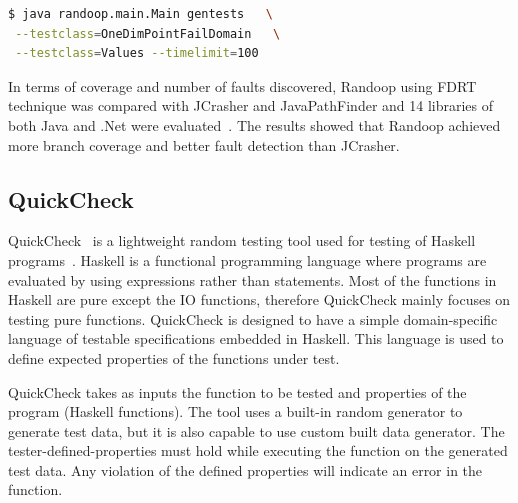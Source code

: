 \begin{lstlisting}[language=bash]
$ java randoop.main.Main gentests   \
 --testclass=OneDimPointFailDomain   \
 --testclass=Values --timelimit=100
\end{lstlisting}

In terms of coverage and number of faults discovered, Randoop using FDRT technique was compared with JCrasher and JavaPathFinder and 14 libraries of both Java and .Net were evaluated~\cite{visser2004test}. The results showed that Randoop achieved more branch coverage and better fault detection than JCrasher. 

\subsection{QuickCheck}
QuickCheck~\cite{claessen2011quickcheck} is a lightweight random testing tool used for testing of Haskell programs~\cite{hudak2007history}. Haskell is a functional programming language where programs are evaluated by using expressions rather than statements. Most of the functions in Haskell are pure except the IO functions, therefore QuickCheck mainly focuses on testing pure functions. QuickCheck is designed to have a simple domain-specific language of testable specifications embedded in Haskell. This language is used to define expected properties of the functions under test. %

QuickCheck takes as inputs the function to be tested and properties of the program (Haskell functions). The tool uses a built-in random generator to generate test data, but it is also capable to use custom built data generator. The tester-defined-properties must hold while executing the function on the generated test data. Any violation of the defined properties will indicate an error in the function.







